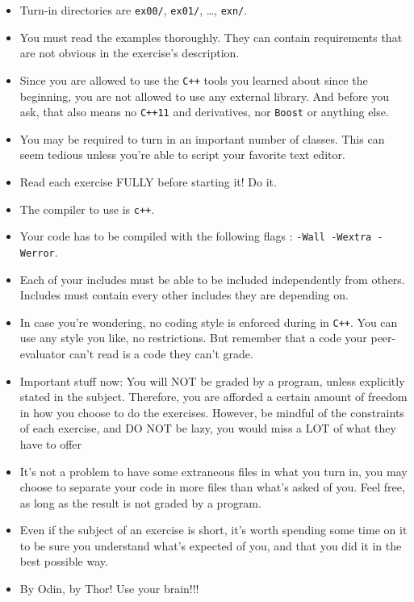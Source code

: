 \begin{itemize}
        \item Turn-in directories are \texttt{ex00/}, \texttt{ex01/},
          \dots, \texttt{exn/}.

        \item You must read the examples thoroughly. They can contain
          requirements that are not obvious in the exercise's
          description.

        \item Since you are allowed to use the \texttt{C++} tools you
          learned about since the beginning, you are not
          allowed to use any external library. And before you ask,
          that also means no \texttt{C++11} and derivatives, nor
          \texttt{Boost} or anything else.
        \item You may be required to turn in an important number of
          classes. This can seem tedious unless you're able to script
          your favorite text editor.

        \item Read each exercise FULLY before starting it! Do it.

        \item The compiler to use is \texttt{c++}.

        \item Your code has to be compiled with the following
          flags : \texttt{-Wall -Wextra -Werror}.

        \item Each of your includes must be able to be included
          independently from others. Includes must contain every
          other includes they are depending on.

        \item In case you're wondering, no coding style is enforced
          during in \texttt{C++}. You can use any style you
          like, no restrictions. But remember that a code your
          peer-evaluator can't read is a code they can't grade.

	    \item Important stuff now: You will NOT be graded by a program,
		unless explicitly stated in the subject. Therefore, you are afforded
		a certain amount of freedom in how you choose to do the exercises.
		However, be mindful of the constraints of each exercise, and DO NOT
		be lazy, you would miss a LOT of what they have to offer

		\item It's not a problem to have some extraneous files in what you turn
		in, you may choose to separate your code in more files than what's
		asked of you. Feel free, as long as the result is not graded by a program.
              
		\item Even if the subject of an exercise is short, it's worth spending
		some time on it to be sure you understand what's expected of
		you, and that you did it in the best possible way.

        \item By Odin, by Thor! Use your brain!!!

\end{itemize}

\newpage
